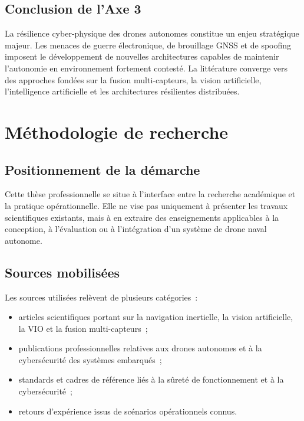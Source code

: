 \documentclass[12pt, a4paper, twoside, openright]{report}
\begin{document}
\section{Conclusion de l'Axe 3}

La résilience cyber-physique des drones autonomes constitue un enjeu stratégique majeur. Les menaces de guerre électronique, de brouillage GNSS et de spoofing imposent le développement de nouvelles architectures capables de maintenir l'autonomie en environnement fortement contesté. La littérature converge vers des approches fondées sur la fusion multi-capteurs, la vision artificielle, l'intelligence artificielle et les architectures résilientes distribuées.

\cleardoublepage

\chapter{Méthodologie de recherche}\label{chap:methodologie}

\section{Positionnement de la démarche}

Cette thèse professionnelle se situe à l'interface entre la recherche académique et la pratique opérationnelle. Elle ne vise pas uniquement à présenter les travaux scientifiques existants, mais à en extraire des enseignements applicables à la conception, à l'évaluation ou à l'intégration d'un système de drone naval autonome.

\section{Sources mobilisées}

Les sources utilisées relèvent de plusieurs catégories~:

\begin{itemize}
    \item articles scientifiques portant sur la navigation inertielle, la vision artificielle, la VIO et la fusion multi-capteurs~;
    \item publications professionnelles relatives aux drones autonomes et à la cybersécurité des systèmes embarqués~;
    \item standards et cadres de référence liés à la sûreté de fonctionnement et à la cybersécurité~;
    \item retours d'expérience issus de scénarios opérationnels connus.
\end{itemize}
\end{document}
